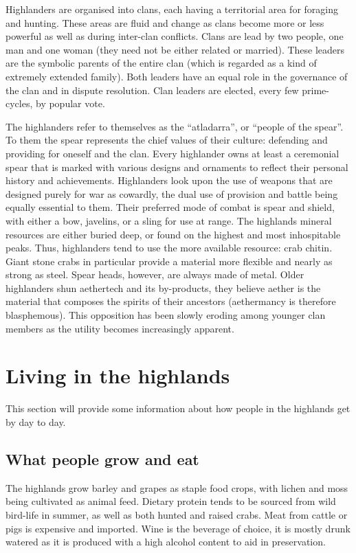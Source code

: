 \documentclass[a4paper,11pt,oneside]{book}
\begin{document}
Highlanders are organised into clans, each having a territorial area for foraging and hunting. These areas are fluid and change as clans become more or less powerful as well as during inter-clan conflicts. Clans are lead by two people, one man and one woman (they need not be either related or married). These leaders are the symbolic parents of the entire clan (which is regarded as a kind of extremely extended family). Both leaders have an equal role in the governance of the clan and in dispute resolution. Clan leaders are elected, every few prime-cycles, by popular vote.  

The highlanders refer to themselves as the ``atladarra'', or ``people of the spear''. To them the spear represents the chief values of their culture: defending and providing for oneself and the clan. Every highlander owns at least a ceremonial spear that is marked with various designs and ornaments to reflect their personal history and achievements. Highlanders look upon the use of weapons that are designed purely for war as cowardly, the dual use of provision and battle being equally essential to them. Their preferred mode of combat is spear and shield, with either a bow, javelins, or a sling for use at range. The highlands mineral resources are either buried deep, or found on the highest and most inhospitable peaks. Thus, highlanders tend to use the more available resource: crab chitin. Giant stone crabs in particular provide a material more flexible and nearly as strong as steel. Spear heads, however, are always made of metal. Older highlanders shun aethertech and its by-products, they believe aether is the material that composes the spirits of their ancestors (aethermancy is therefore blasphemous). This opposition has been slowly eroding among younger clan members as the utility becomes increasingly apparent.  



\section{Living in the highlands}
This section will provide some information about how people in the highlands get by day to day.

\subsection{What people grow and eat}
The highlands grow barley and grapes as staple food crops, with lichen and moss being cultivated as animal feed. Dietary protein tends to be sourced from wild bird-life in summer, as well as both hunted and raised crabs. Meat from cattle or pigs is expensive and imported. Wine is the beverage of choice, it is mostly drunk watered as it is produced with a high alcohol content to aid in preservation. 
\end{document}
